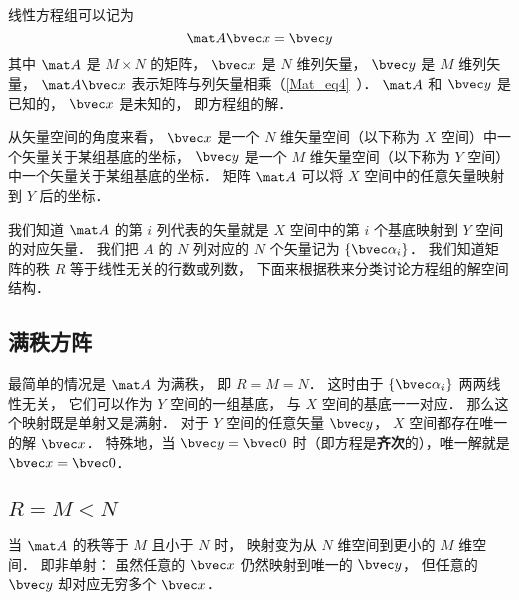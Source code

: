 
\begin{issues}
\issueDraft
{}
\end{issues}


线性方程组可以记为
\begin{equation}\label{LinEq_eq1}
\mat A \bvec x = \bvec y
\end{equation}
其中 $\mat A$ 是 $M \times N$ 的矩阵， $\bvec x$ 是 $N$ 维列矢量， $\bvec y$ 是 $M$ 维列矢量， $\mat A \bvec x$ 表示矩阵与列矢量相乘（\autoref{Mat_eq4}~）． $\mat A$ 和 $\bvec y$ 是已知的， $\bvec x$ 是未知的， 即方程组的解．

从矢量空间的角度来看， $\bvec x$ 是一个 $N$ 维矢量空间（以下称为 $X$ 空间）中一个矢量关于某组基底的坐标， $\bvec y$ 是一个 $M$ 维矢量空间（以下称为 $Y$ 空间）中一个矢量关于某组基底的坐标． 矩阵 $\mat A$ 可以将 $X$ 空间中的任意矢量映射到 $Y$ 后的坐标．

我们知道 $\mat A$ 的第 $i$ 列代表的矢量就是 $X$ 空间中的第 $i$ 个基底映射到 $Y$ 空间的对应矢量． 我们把 $A$ 的 $N$ 列对应的 $N$ 个矢量记为 $\{\bvec \alpha_i\}$． 我们知道矩阵的秩 $R$ 等于线性无关的行数或列数， 下面来根据秩来分类讨论方程组的解空间结构．


\subsection{满秩方阵}
最简单的情况是 $\mat A$ 为满秩， 即 $R = M = N$． 这时由于 $\{\bvec \alpha_i\}$ 两两线性无关， 它们可以作为 $Y$ 空间的一组基底， 与 $X$ 空间的基底一一对应． 那么这个映射既是单射又是满射．%
对于 $Y$ 空间的任意矢量 $\bvec y$， $X$ 空间都存在唯一的解 $\bvec x$． 特殊地，当 $\bvec y = \bvec 0$ 时（即方程是\textbf{齐次}的），唯一解就是 $\bvec x = \bvec 0$．

\subsection{$R = M < N$}

当 $\mat A$ 的秩等于 $M$ 且小于 $N$ 时， 映射变为从 $N$ 维空间到更小的 $M$ 维空间． 即非单射： 虽然任意的 $\bvec x$ 仍然映射到唯一的 $\bvec y$， 但任意的 $\bvec y$ 却对应无穷多个 $\bvec x$． 

